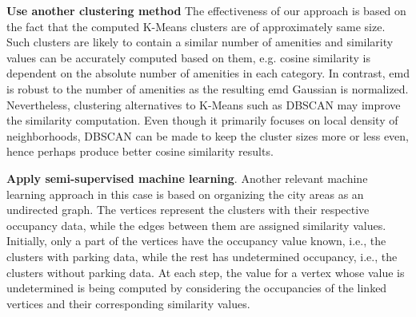 \begin{romanlist}
	\item \textbf{Use another clustering method}
	The effectiveness of our approach is based on the fact that the computed K-Means clusters are of approximately same size. Such clusters are likely to contain a similar number of amenities and similarity values can be accurately computed based on them, e.g. cosine similarity is dependent on the absolute number of amenities in each category. In contrast, emd is robust to the number of amenities as the resulting emd Gaussian is normalized. Nevertheless, clustering alternatives to K-Means such as DBSCAN may improve the similarity computation. Even though it primarily focuses on local density of neighborhoods, DBSCAN can be made to keep the cluster sizes more or less even, hence perhaps produce better cosine similarity results. 
	
	\item \textbf{Apply semi-supervised machine learning}.
	Another relevant machine learning approach in this case is based on organizing the city areas as an undirected graph.
	The vertices represent the clusters with their respective occupancy data, while the edges between them are assigned similarity values.
	Initially, only a part of the vertices have the occupancy value known, i.e., the clusters with parking data, while the rest has undetermined occupancy, i.e., the clusters without parking data.
	At each step, the value for a vertex whose value is undetermined is being computed by considering the occupancies of the linked vertices and their corresponding similarity values.
\end{romanlist} 


